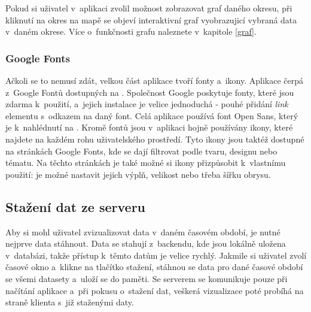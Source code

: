 Pokud si uživatel v~aplikaci zvolil možnost zobrazovat graf daného okresu, při kliknutí na okres na mapě se objeví interaktivní graf vyobrazujicí vybraná data v~daném okrese. Více o~funkčnosti grafu naleznete v~kapitole \ref{graf}.

\subsubsection*{Google Fonts}

Ačkoli se to nemusí zdát, velkou část aplikace tvoří fonty a~ikony. Aplikace čerpá z~Google Fontů dostupných na \cite{google-fonts}. Společnost Google poskytuje fonty, které jsou zdarma k~použití, a~jejich instalace je velice jednoduchá - pouhé přidání \emph{link} elementu s~odkazem na daný font. Celá aplikace používá font Open Sans, který je k~nahlédnutí na \cite{google-fonts-opensans}. Kromě fontů jsou v~aplikaci hojně používány ikony, které najdete na každém rohu uživatelského prostředí. Tyto ikony jsou taktéž dostupné na stránkách Google Fonts, kde se dají filtrovat podle tvaru, designu nebo tématu. Na těchto stránkách je také možné si ikony přizpůsobit k~vlastnímu použití: je možné nastavit jejich výplň, velikost nebo třeba šířku obrysu.

\subsection{Stažení dat ze serveru}

Aby si mohl uživatel zvizualizovat data v~daném časovém období, je nutné nejprve data stáhnout. Data se stahují z~backendu, kde jsou lokálně uložena v~databázi, takže přístup k~těmto datům je velice rychlý. Jakmile si uživatel zvolí časové okno a~klikne na tlačítko stažení, stáhnou se data pro dané časové období se všemi datasety a~uloží se do paměti. Se serverem se komunikuje pouze při načítání aplikace a~při pokusu o~stažení dat, veškerá vizualizace poté probíhá na straně klienta s~již staženými daty.

